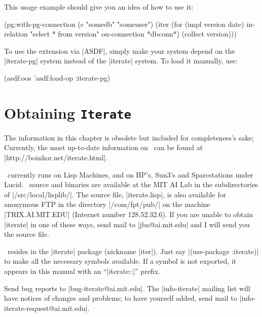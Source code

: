 This usage example should give you an idea of how to use it:

\begin{program}
(pg:with-pg-connection (c "somedb" "someuser")
  (iter (for (impl version date) in-relation "select * from version"
                                 on-connection *dbconn*)
        (collect version)))
\end{program}

To use the extension via |ASDF|, simply make your system depend on the
|iterate-pg| system instead of the |iterate| system. To load it
manually, use:

\begin{program}
  (asdf:oos 'asdf:load-op :iterate-pg)
\end{program}

\section{Obtaining {\tt Iterate}}

\begin{sloppypar}
The information in this chapter is obsolete but included for
completeness's sake; Currently, the most up-to-date information on
\iter\ can be found at |http://boinkor.net/iterate.html|.
\end{sloppypar}

\begin{sloppypar}
\iter\ currently runs on Lisp Machines, and on
HP's, Sun3's and Sparcstations under Lucid.
\iter\ source and binaries are available at the MIT AI Lab in the
subdirectories of |/src/local/lisplib/|.  The source file,
|iterate.lisp|, is also available for anonymous FTP in the directory
|/com/fpt/pub/| on the machine |TRIX.AI.MIT.EDU| (Internet number
128.52.32.6).  If you are unable to obtain |iterate| in one of these
ways, send mail to |jba@ai.mit.edu| and I will send you the source
file.
\end{sloppypar}

\begin{sloppypar}
\iter\ resides in the |iterate| package (nickname |iter|).  Just say
\linebreak |(use-package :iterate)| to make all the necessary symbols
available.
If a symbol is not exported, it appears in this manual with an
``|iterate::|'' prefix.
\end{sloppypar}

Send bug reports to |bug-iterate@ai.mit.edu|.  The |info-iterate|
mailing list will have notices of changes and problems; to have
yourself added, send mail to |info-iterate-request@ai.mit.edu|.


